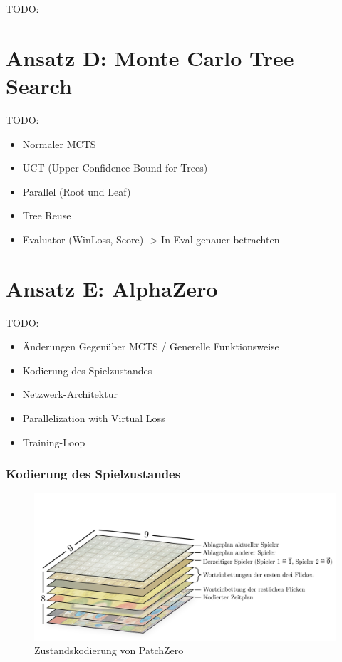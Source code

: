 TODO:

\section{Ansatz D: Monte Carlo Tree Search}
\label{section:erstellung-ansatz-c}

TODO:

\begin{itemize}
    \item Normaler MCTS
    \item UCT (Upper Confidence Bound for Trees)
    \item Parallel (Root und Leaf)
    \item Tree Reuse
    \item Evaluator (WinLoss, Score) -> In Eval genauer betrachten
\end{itemize}

\section{Ansatz E: AlphaZero}
\label{section:erstellung-ansatz-d}

TODO:

\begin{itemize}
    \item Änderungen Gegenüber MCTS / Generelle Funktionsweise
    \item Kodierung des Spielzustandes
    \item Netzwerk-Architektur
    \item Parallelization with Virtual Loss
    \item Training-Loop
\end{itemize}

\subsubsection*{Kodierung des Spielzustandes}

\begin{figure}[!ht]
    \centering
    \vspace*{-1.75cm}
    \includegraphics[width=\textwidth]{res/pictures/patch-zero-state.pdf}
    \caption{Zustandskodierung von PatchZero}
    \label{fig:patch-zero-state}
\end{figure}

